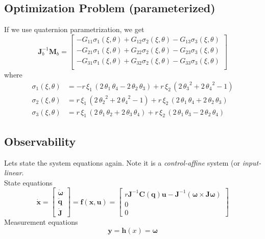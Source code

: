 \subsection{Optimization Problem (parameterized)}
If we use quaternion parametrization, we get
\begin{equation}
\mathbf{J}_b^{-1}\mathbf{M}_b = 
\left[\begin{array}{c}
-G_{11} \sigma_1(\xi,\theta) + G_{12} \sigma_2(\xi,\theta) - G_{13} \sigma_3(\xi,\theta) \\
-G_{21} \sigma_1(\xi,\theta) + G_{22} \sigma_2(\xi,\theta) - G_{23} \sigma_3(\xi,\theta) \\
-G_{31} \sigma_1(\xi,\theta) + G_{32} \sigma_2(\xi,\theta) - G_{33} \sigma_3(\xi,\theta) \\
\end{array}\right]
\end{equation}
where
\begin{align*}
\sigma_1(\xi,\theta) &= - r\, {\xi_1}\, \left(2\, {\theta_1}\, {\theta_4} - 2\, {\theta_2}\, {\theta_3}\right) + r\, {\xi_2}\, \left(2\, {{\theta_3}}^2 + 2\, {{\theta_4}}^2 - 1\right) \\
\sigma_2(\xi,\theta) &= r\, {\xi_1}\, \left(2\, {{\theta_2}}^2 + 2\, {{\theta_4}}^2 - 1\right) + r\, {\xi_2}\, \left(2\, {\theta_1}\, {\theta_4} + 2\, {\theta_2}\, {\theta_3}\right) \\
\sigma_3(\xi,\theta) &= r\, {\xi_1}\, \left(2\, {\theta_1}\, {\theta_2} + 2\, {\theta_3}\, {\theta_4}\right) + r\, {\xi_2}\, \left(2\, {\theta_1}\, {\theta_3} - 2\, {\theta_2}\, {\theta_4}\right)
\end{align*}

\subsection{Observability}
Lets state the system equations again. Note it is a \textit{control-affine} system (or \textit{input-linear}. \\
State equations
\begin{equation}
\dot{\mathbf{x}} = 
\left[ \begin{array}{c}
\dot{\boldsymbol{\omega}} \\
\dot{\mathbf{q}} \\
\dot{\mathbf{J}}
\end{array} \right]
= \mathbf{f}(\mathbf{x}, \mathbf{u}) =
\left[ \begin{array}{c}
r \mathbf{J}^{-1} \mathbf{C}(\mathbf{q}) \mathbf{u} - \mathbf{J}^{-1}(\boldsymbol{\omega} \times \mathbf{J} \boldsymbol{\omega} ) \\
0 \\
0
\end{array} \right]
\end{equation}
Measurement equations
\begin{equation}
\mathbf{y} = \mathbf{h}(x) = \boldsymbol{\omega}
\end{equation}

